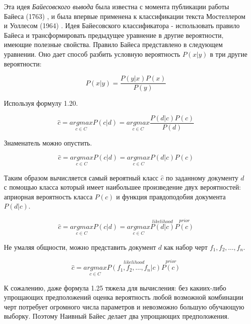 \documentclass[a4paper,12pt,preview]{report} %
\begin{document}
	Эта идея \textit{Байесовского вывода} была известна с момента публикации работы Байеса (1763) \cite{10}, и была впервые применена к классификации текста Мостеллером и Уоллесом (1964) \cite{11}. Идея Байесовского классификатора - использовать правило Байеса и трансформировать предыдущее уравнение в другие вероятности, имеющие полезные свойства. Правило Байеса представлено в следующем уравнении. Оно дает способ разбить условную вероятность $P(x | y)$ в три другие вероятности:
	
	
	\begin{equation}
		P(x | y) = \dfrac{P(y | x) P(x)}{P(y)}
	\end{equation}
	
	Используя  формулу 1.20.
	
	\begin{equation}
		\hat{c} = \underset{c \in C}{argmax} P(c | d) = \underset{c \in C}{argmax} \dfrac{P(d | c) P(c)}{P(d)}
	\end{equation}
	
	Знаменатель можно опустить.
	
	\begin{equation}
		\hat{c} = \underset{c \in C}{argmax} P(c | d) = \underset{c \in C}{argmax} P(d | c) P(c)
	\end{equation}

	Таким образом вычисляется самый вероятный класс $\hat{c}$ по заданному документу $d$ с помощью класса который имеет наибольшее произведение двух вероятностей: априорная вероятность класса $P(c)$ и функция правдоподобия документа  $P(d | c)$.
	
	
	\begin{equation}
		\hat{c} = \underset{c \in C}{argmax} P(c | d) = \underset{c \in C}{argmax} \overset{likelihood}{P(d | c)} \overset{prior}{P(c)}
	\end{equation}
	
	Не умаляя общности, можно представить документ $d$ как набор черт $f_1, f_2, \dots, f_n$.
	
	
	\begin{equation}
		\hat{c} = \underset{c \in C}{argmax} \overset{likelihood}{P(f_1, f_2, \dots, f_n | c)} \overset{prior}{P(c)}
	\end{equation}
	
	
	К сожалению, даже формула 1.25 тяжела для вычисления: без какиих-либо упрощающих предположений оценка вероятность любой возможной комбинации черт потребует огромного числа параметров и невозможно большую обучающую выборку. Поэтому Наивный Байес делает два упрощающих предположения.
	
\end{document}
